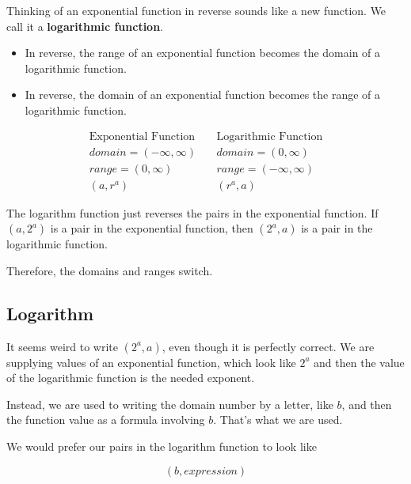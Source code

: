 \documentclass{ximera}
\begin{document}
Thinking of an exponential function in reverse sounds like a new function. We call it a \textbf{\textcolor{purple!85!blue}{logarithmic function}}.   \\


\begin{itemize}
\item In reverse, the range of an exponential function becomes the domain of a logarithmic function.
\item In reverse, the domain of an exponential function becomes the range of a logarithmic function.
\end{itemize}





\[
\begin{array}{lcl}
\text{Exponential Function}  &     &  \text{Logarithmic Function}  \\
domain = (-\infty, \infty)  &  \   &  domain = (0, \infty)  \\
range = (0, \infty)  &    &  range = (-\infty, \infty)  \\
(a, r^a)    &    &   (r^a, a)
\end{array}
\]


The logarithm function just reverses the pairs in the exponential function.  If $(a, 2^a)$ is a pair in the exponential function, then $(2^a, a)$ is a pair in the logarithmic function.


Therefore, the domains and ranges switch. \\






\subsection{Logarithm}

It seems weird to write $(2^a, a)$, even though it is perfectly correct.  We are supplying values of an exponential function, which look like $2^a$ and then the value of the logarithmic function is the needed exponent.

Instead, we are used to writing the domain number by a letter, like $b$, and then the function value as a formula involving $b$. That's what we are used.

We would prefer our pairs in the logarithm function to look like 

\[ (b, expression)  \]
\end{document}
